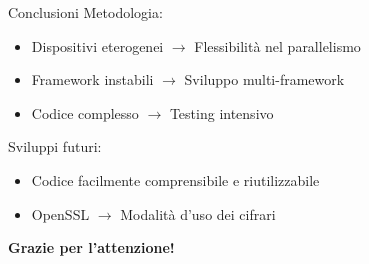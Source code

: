 \documentclass[11pt,xcolor=dvipsnames]{beamer}
\begin{document}
\begin{frame}{Conclusioni}
Metodologia:
\begin{itemize}
\item Dispositivi eterogenei $\rightarrow$ Flessibilità nel parallelismo
\item Framework instabili $\rightarrow$ Sviluppo multi-framework
\item Codice complesso $\rightarrow$ Testing intensivo
\end{itemize}

\vspace{5mm}
Sviluppi futuri:
\begin{itemize}
\item Codice facilmente comprensibile e riutilizzabile
\item OpenSSL $\rightarrow$ Modalità d'uso dei cifrari
\end{itemize}
\end{frame}

\begin{frame}[plain]
\vspace{12mm}
\begin{center}
\textbf{\huge{Grazie per l'attenzione!}}
\end{center}
\end{frame}
\end{document}
